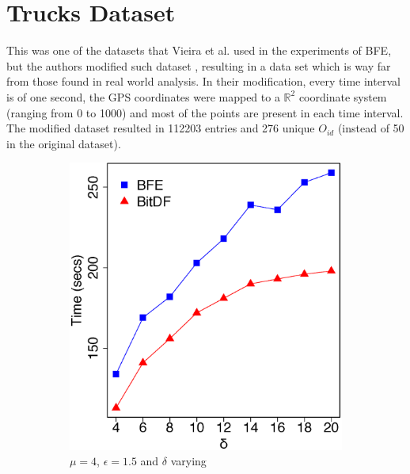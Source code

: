 \section{Trucks Dataset}
\label{subsec:trucks}
This was one of the datasets that Vieira et al. \citep{vieira} used in the experiments of BFE, but the authors modified
such dataset \citep{trucksdataset}, resulting in a data set which is way far from those found in real world analysis. In
their modification, every time interval is of one second, the GPS coordinates were mapped to a $\mathbb{R}^2$ coordinate
system (ranging from 0 to 1000) and most of the points are present in each time interval. The modified dataset resulted
in 112203 entries and 276 unique $O_{id}$ (instead of 50 in the original dataset).

\begin{figure}[h!]
    \centering
    \begin{subfigure}[t]{0.48\textwidth}
        \includegraphics[width=\textwidth]{images/Trucks_n_4_g_1_5_varying_l.eps}
        \caption{$\mu = 4$, $\epsilon = 1.5$ and $\delta$ varying}
        \label{fig:trucks_vary_l}
    \end{subfigure}
    \begin{subfigure}[t]{0.48\textwidth}

\end{subfigure}
\end{figure}
